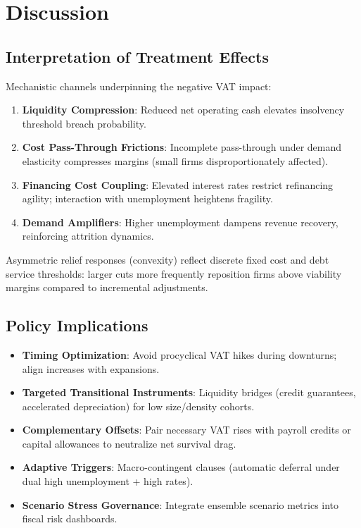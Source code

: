 \section{Discussion}\label{sec:discussion}

\subsection{Interpretation of Treatment Effects}
Mechanistic channels underpinning the negative VAT impact:
\begin{enumerate}
  \item \textbf{Liquidity Compression}: Reduced net operating cash elevates insolvency threshold breach probability.
  \item \textbf{Cost Pass-Through Frictions}: Incomplete pass-through under demand elasticity compresses margins (small firms disproportionately affected).
  \item \textbf{Financing Cost Coupling}: Elevated interest rates restrict refinancing agility; interaction with unemployment heightens fragility.
  \item \textbf{Demand Amplifiers}: Higher unemployment dampens revenue recovery, reinforcing attrition dynamics.
\end{enumerate}
Asymmetric relief responses (convexity) reflect discrete fixed cost and debt service thresholds: larger cuts more frequently reposition firms above viability margins compared to incremental adjustments.

\subsection{Policy Implications}
\begin{itemize}
  \item \textbf{Timing Optimization}: Avoid procyclical VAT hikes during downturns; align increases with expansions.
  \item \textbf{Targeted Transitional Instruments}: Liquidity bridges (credit guarantees, accelerated depreciation) for low size/density cohorts.
  \item \textbf{Complementary Offsets}: Pair necessary VAT rises with payroll credits or capital allowances to neutralize net survival drag.
  \item \textbf{Adaptive Triggers}: Macro-contingent clauses (automatic deferral under dual high unemployment + high rates).
  \item \textbf{Scenario Stress Governance}: Integrate ensemble scenario metrics into fiscal risk dashboards.
\end{itemize}

